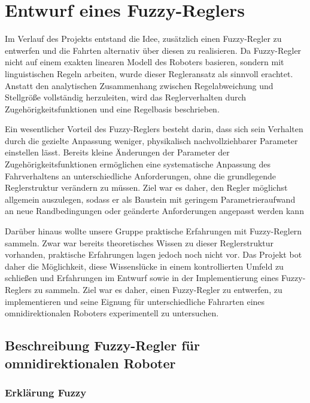 \chapter{Entwurf eines Fuzzy-Reglers}
\label{sec:Fuzzy}
Im Verlauf des Projekts entstand die Idee, zusätzlich einen Fuzzy-Regler zu entwerfen und die Fahrten alternativ über diesen zu realisieren. Da Fuzzy-Regler nicht auf einem exakten linearen Modell des Roboters basieren, sondern mit linguistischen Regeln arbeiten, wurde dieser Regleransatz als sinnvoll erachtet. Anstatt den analytischen Zusammenhang zwischen Regelabweichung und Stellgröße vollständig herzuleiten, wird das Reglerverhalten durch Zugehörigkeitsfunktionen und eine Regelbasis beschrieben. 

Ein wesentlicher Vorteil des Fuzzy-Reglers besteht darin, dass sich sein Verhalten durch die gezielte Anpassung weniger, physikalisch nachvollziehbarer Parameter einstellen lässt. Bereits kleine Änderungen der Parameter der Zugehörigkeitsfunktionen ermöglichen eine systematische Anpassung des Fahrverhaltens an unterschiedliche Anforderungen, ohne die grundlegende Reglerstruktur verändern zu müssen. Ziel war es daher, den Regler möglichst allgemein auszulegen, sodass er als Baustein mit geringem Parametrieraufwand an neue Randbedingungen oder geänderte Anforderungen angepasst werden kann


Darüber hinaus wollte unsere Gruppe praktische Erfahrungen mit Fuzzy-Reglern sammeln. Zwar war bereits theoretisches Wissen zu dieser Reglerstruktur vorhanden, praktische Erfahrungen lagen jedoch noch nicht vor. Das Projekt bot daher die Möglichkeit, diese Wissenslücke in einem kontrollierten Umfeld zu schließen und Erfahrungen im Entwurf sowie in der Implementierung eines Fuzzy-Reglers zu sammeln. Ziel war es daher, einen Fuzzy-Regler zu entwerfen, zu implementieren und seine Eignung für unterschiedliche Fahrarten eines omnidirektionalen Roboters experimentell zu untersuchen. \cite{Nguyen2022,Mondal2019,Mendili2017}

\section{Beschreibung Fuzzy-Regler für omnidirektionalen Roboter}

\subsection{Erklärung Fuzzy}


